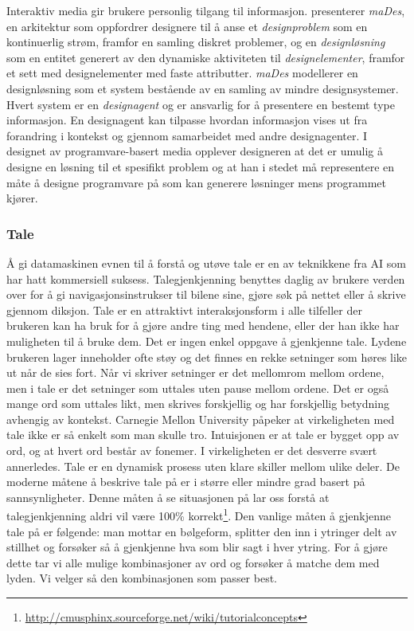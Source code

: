 Interaktiv media gir brukere personlig tilgang til informasjon. \citet{ishizaki96} presenterer \emph{maDes}, en arkitektur som oppfordrer designere til å anse et \emph{designproblem} som en kontinuerlig strøm, framfor en samling diskret problemer, og en \emph{designløsning} som en entitet generert av den dynamiske aktiviteten til \emph{designelementer}, framfor et sett med designelementer med faste attributter. \emph{maDes} modellerer en designløsning som et system bestående av en samling av mindre designsystemer. Hvert system er en \emph{designagent} og er ansvarlig for å presentere en bestemt type informasjon. En designagent kan tilpasse hvordan informasjon vises ut fra forandring i kontekst og gjennom samarbeidet med andre designagenter. I designet av programvare-basert media opplever designeren at det er umulig å designe en løsning til et spesifikt problem og at han i stedet må representere en måte å designe programvare på som kan generere løsninger mens programmet kjører.\\ 

\subsubsection*{Tale}
\label{ch:tale}
Å gi datamaskinen evnen til å forstå og utøve tale er en av teknikkene fra AI som har hatt kommersiell suksess. Talegjenkjenning benyttes daglig av brukere verden over for å gi navigasjonsinstrukser til bilene sine, gjøre søk på nettet eller å skrive gjennom diksjon. Tale er en attraktivt interaksjonsform i alle tilfeller der brukeren kan ha bruk for å gjøre andre ting med hendene, eller der han ikke har muligheten til å bruke dem. Det er ingen enkel oppgave å gjenkjenne tale. Lydene brukeren lager inneholder ofte støy og det finnes en rekke setninger som høres like ut når de sies fort. Når vi skriver setninger er det mellomrom mellom ordene, men i tale er det setninger som uttales uten pause mellom ordene. Det er også mange ord som uttales likt, men skrives forskjellig og har forskjellig betydning avhengig av kontekst. Carnegie Mellon University påpeker at virkeligheten med tale ikke er så enkelt som man skulle tro. Intuisjonen er at tale er bygget opp av ord, og at hvert ord består av fonemer. I virkeligheten er det desverre svært annerledes. Tale er en dynamisk prosess uten klare skiller mellom ulike deler. De moderne måtene å beskrive tale på er i større eller mindre grad basert på sannsynligheter. Denne måten å se situasjonen på lar oss forstå at talegjenkjenning aldri vil være 100\% korrekt\footnote{\url{http://cmusphinx.sourceforge.net/wiki/tutorialconcepts}}. Den vanlige måten å gjenkjenne tale på er følgende: man mottar en bølgeform, splitter den inn i ytringer delt av stillhet og forsøker så å gjenkjenne hva som blir sagt i hver ytring. For å gjøre dette tar vi alle mulige kombinasjoner av ord og forsøker å matche dem med lyden. Vi velger så den kombinasjonen som passer best.

